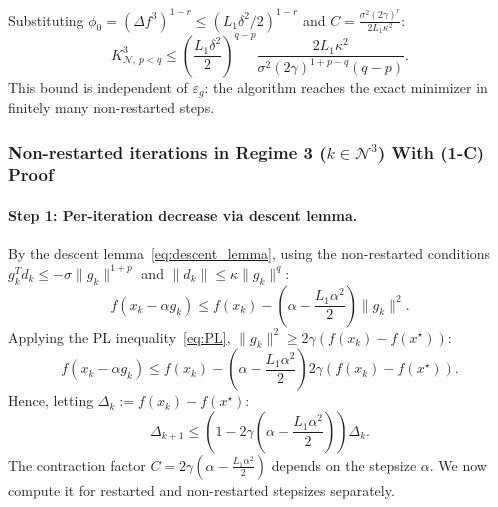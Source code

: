 \documentclass{article}
\begin{document}
Substituting $\phi_0 = (\Delta f^3)^{1-r} \leq (L_1\delta^2/2)^{1-r}$ and $C = \frac{\sigma^2(2\gamma)^r}{2L_1\kappa^2}$:
\begin{equation}
\label{eq:N3_r_small}
K^3_{\mathcal{N},\, p<q} \leq \left(\frac{L_1\delta^2}{2}\right)^{q-p}\frac{2L_1\kappa^2}{\sigma^2(2\gamma)^{1+p-q}(q-p)}.
\end{equation}
This bound is independent of $\varepsilon_g$: the algorithm reaches the exact minimizer in finitely many non-restarted steps.

\subsubsection{Non-restarted iterations in Regime 3 ($k \in \mathcal{N}^3$) With (1-C) Proof}

\paragraph{Step 1: Per-iteration decrease via descent lemma.}
By the descent lemma~\eqref{eq:descent_lemma}, using the non-restarted 
conditions $g_k^Td_k \leq -\sigma\|g_k\|^{1+p}$ and $\|d_k\| \leq \kappa\|g_k\|^q$:
\[
f(x_k - \alpha g_k) \leq f(x_k) - \left(\alpha - \frac{L_1\alpha^2}{2}\right)\|g_k\|^2.
\]
Applying the PL inequality~\eqref{eq:PL}, $\|g_k\|^2 \geq 2\gamma(f(x_k) - f(x^\star))$:
\[
f(x_k - \alpha g_k) \leq f(x_k) - \left(\alpha - \frac{L_1\alpha^2}{2}\right) 
2\gamma(f(x_k) - f(x^\star)).
\]
Hence, letting $\Delta_k := f(x_k) - f(x^\star)$:
\begin{equation}
\label{eq:descent_R3_N}
\Delta_{k+1} \leq \left(1 - 2\gamma\left(\alpha - \frac{L_1\alpha^2}{2}\right)\right)\Delta_k.
\end{equation}
The contraction factor $C = 2\gamma\!\left(\alpha - \frac{L_1\alpha^2}{2}\right)$ 
depends on the stepsize $\alpha$. We now compute it for restarted 
and non-restarted stepsizes separately.
\end{document}
